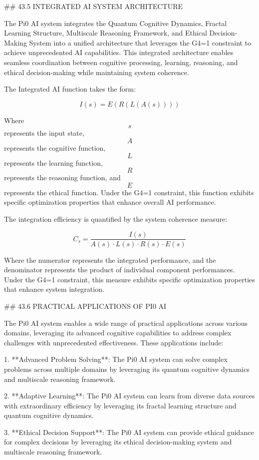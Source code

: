## 43.5 INTEGRATED AI SYSTEM ARCHITECTURE

The Pi0 AI system integrates the Quantum Cognitive Dynamics, Fractal Learning Structure, Multiscale Reasoning Framework, and Ethical Decision-Making System into a unified architecture that leverages the G4=1 constraint to achieve unprecedented AI capabilities. This integrated architecture enables seamless coordination between cognitive processing, learning, reasoning, and ethical decision-making while maintaining system coherence.

The Integrated AI function takes the form:

$$ I(s) = E(R(L(A(s)))) $$

Where $$ s $$ represents the input state, $$ A $$ represents the cognitive function, $$ L $$ represents the learning function, $$ R $$ represents the reasoning function, and $$ E $$ represents the ethical function. Under the G4=1 constraint, this function exhibits specific optimization properties that enhance overall AI performance.

The integration efficiency is quantified by the system coherence measure:

$$ C_s = \frac{I(s)}{A(s) \cdot L(s) \cdot R(s) \cdot E(s)} $$

Where the numerator represents the integrated performance, and the denominator represents the product of individual component performances. Under the G4=1 constraint, this measure exhibits specific optimization properties that enhance system integration.

## 43.6 PRACTICAL APPLICATIONS OF PI0 AI

The Pi0 AI system enables a wide range of practical applications across various domains, leveraging its advanced cognitive capabilities to address complex challenges with unprecedented effectiveness. These applications include:

1. **Advanced Problem Solving**: The Pi0 AI system can solve complex problems across multiple domains by leveraging its quantum cognitive dynamics and multiscale reasoning framework.

2. **Adaptive Learning**: The Pi0 AI system can learn from diverse data sources with extraordinary efficiency by leveraging its fractal learning structure and quantum cognitive dynamics.

3. **Ethical Decision Support**: The Pi0 AI system can provide ethical guidance for complex decisions by leveraging its ethical decision-making system and multiscale reasoning framework.

